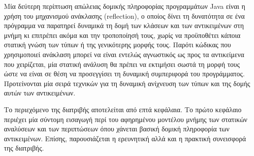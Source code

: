\begin{itemize}
  Μία δεύτερη περίπτωση απώλειας δομικής πληροφορίας προγραμμάτων {\en
    Java} είναι η χρήση του μηχανισμού ανάκλασης ({\en reflection}), ο
  οποίος δίνει τη δυνατότητα σε ένα πρόγραμμα να παρατηρεί δυναμικά τη
  δομή των κλάσεων και των αντικειμένων στη μνήμη κι επιτρέπει ακόμα
  και την τροποποίησή τους, χωρίς να προϋποθέτει κάποια στατική γνώση
  των τύπων ή της γενικότερης μορφής τους.  Παρότι κώδικας που
  χρησιμοποιεί ανάκλαση μπορεί να είναι εντελώς αγνωστικός ως προς τα
  αντικείμενα που χειρίζεται, μία στατική ανάλυση θα πρέπει να
  εκτιμήσει σωστά τη μορφή τους ώστε να είναι σε θέση να προσεγγίσει
  τη δυναμική συμπεριφορά του προγράμματος.  Προτείνονται μία σειρά
  τεχνικών για τη δυναμική ανίχνευση των τύπων και της δομής αυτών των
  αντικειμένων.
\end{itemize}
 
Το περιεχόμενο της διατριβής αποτελείται από επτά κεφάλαια.  Το πρώτο
κεφάλαιο περιέχει μία σύντομη εισαγωγή περί του αφηρημένου μοντέλου
μνήμης των στατικών αναλύσεων και των περιπτώσεων όπου χάνεται βασική
δομική πληροφορία των αντικειμένων.  Επίσης, παρουσιάζεται η
ερευνητική αλλά και η πρακτική συνεισφορά της διατριβής.




